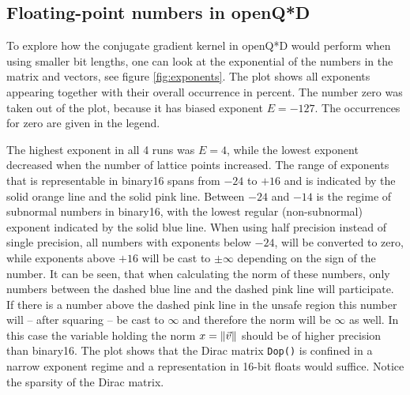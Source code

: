 \documentclass{article}
\theoremstyle{plain} %
\theoremstyle{convention} %
\theoremstyle{remark} %
\def\code#1{\texttt{#1}}
\numberwithin{equation}{section}
\begin{document}
\subsection{Floating-point numbers in openQ*D}

To explore how the conjugate gradient kernel in openQ*D would perform when using smaller bit lengths, one can look at the exponential of the numbers in the matrix and vectors, see figure \ref{fig:exponents}. The plot shows all exponents appearing together with their overall occurrence in percent. The number zero was taken out of the plot, because it has biased exponent $E=-127$. The occurrences for zero are given in the legend.

The highest exponent in all 4 runs was $E=4$, while the lowest exponent decreased when the number of lattice points increased. The range of exponents that is representable in \gls{binary16} spans from \textcolor{corange}{$-24$} to \textcolor{cpink}{$+16$} and is indicated by the \textcolor{corange}{solid orange line} and the \textcolor{cpink}{solid pink line}. Between \textcolor{corange}{$-24$} and \textcolor{cblue}{$-14$} is the regime of subnormal numbers in \gls{binary16}, with the lowest regular (non-subnormal) exponent indicated by the \textcolor{cblue}{solid blue line}. When using half precision instead of single precision, all numbers with exponents below \textcolor{corange}{$-24$}, will be converted to zero, while exponents above \textcolor{cpink}{$+16$} will be cast to $\pm \infty$ depending on the sign of the number. It can be seen, that when calculating the norm of these numbers, only numbers between the \textcolor{cblue}{dashed blue line} and the \textcolor{cpink}{dashed pink line} will participate. If there is a number above the dashed pink line in the \textcolor{cyellow}{unsafe region} this number will -- after squaring -- be cast to $\infty$ and therefore the norm will be $\infty$ as well\footnotemark. In this case the variable holding the norm $x = \norm{\vec{v}}$ should be of higher precision than \gls{binary16}. The plot shows that the Dirac matrix \code{Dop()} is confined in a narrow exponent regime and a representation in 16-bit floats would suffice. Notice the sparsity of the Dirac matrix.

\end{document}

